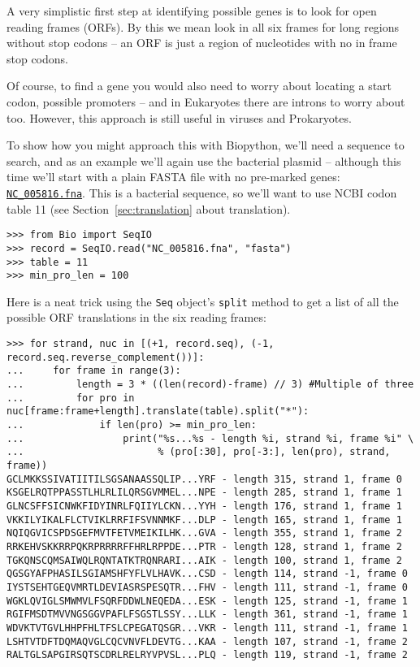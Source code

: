 A very simplistic first step at identifying possible genes is to look for
open reading frames (ORFs).  By this we mean look in all six frames for long
regions without stop codons -- an ORF is just a region of nucleotides with
no in frame stop codons.

Of course, to find a gene you would also need to worry about locating a start
codon, possible promoters -- and in Eukaryotes there are introns to worry about
too.  However, this approach is still useful in viruses and Prokaryotes.

To show how you might approach this with Biopython, we'll need a sequence to
search, and as an example we'll again use the bacterial plasmid -- although
this time we'll start with a plain FASTA file with no pre-marked genes:
\href{https://raw.githubusercontent.com/biopython/biopython/master/Tests/GenBank/NC_005816.fna}
{\texttt{NC\_005816.fna}}. This is a bacterial sequence, so we'll want to use
NCBI codon table 11 (see Section~\ref{sec:translation} about translation).

\begin{verbatim}
>>> from Bio import SeqIO
>>> record = SeqIO.read("NC_005816.fna", "fasta")
>>> table = 11
>>> min_pro_len = 100
\end{verbatim}

Here is a neat trick using the \verb|Seq| object's \verb|split| method to
get a list of all the possible ORF translations in the six reading frames:

\begin{verbatim}
>>> for strand, nuc in [(+1, record.seq), (-1, record.seq.reverse_complement())]:
...     for frame in range(3):
...         length = 3 * ((len(record)-frame) // 3) #Multiple of three
...         for pro in nuc[frame:frame+length].translate(table).split("*"):
...             if len(pro) >= min_pro_len:
...                 print("%s...%s - length %i, strand %i, frame %i" \
...                       % (pro[:30], pro[-3:], len(pro), strand, frame))
GCLMKKSSIVATIITILSGSANAASSQLIP...YRF - length 315, strand 1, frame 0
KSGELRQTPPASSTLHLRLILQRSGVMMEL...NPE - length 285, strand 1, frame 1
GLNCSFFSICNWKFIDYINRLFQIIYLCKN...YYH - length 176, strand 1, frame 1
VKKILYIKALFLCTVIKLRRFIFSVNNMKF...DLP - length 165, strand 1, frame 1
NQIQGVICSPDSGEFMVTFETVMEIKILHK...GVA - length 355, strand 1, frame 2
RRKEHVSKKRRPQKRPRRRRFFHRLRPPDE...PTR - length 128, strand 1, frame 2
TGKQNSCQMSAIWQLRQNTATKTRQNRARI...AIK - length 100, strand 1, frame 2
QGSGYAFPHASILSGIAMSHFYFLVLHAVK...CSD - length 114, strand -1, frame 0
IYSTSEHTGEQVMRTLDEVIASRSPESQTR...FHV - length 111, strand -1, frame 0
WGKLQVIGLSMWMVLFSQRFDDWLNEQEDA...ESK - length 125, strand -1, frame 1
RGIFMSDTMVVNGSGGVPAFLFSGSTLSSY...LLK - length 361, strand -1, frame 1
WDVKTVTGVLHHPFHLTFSLCPEGATQSGR...VKR - length 111, strand -1, frame 1
LSHTVTDFTDQMAQVGLCQCVNVFLDEVTG...KAA - length 107, strand -1, frame 2
RALTGLSAPGIRSQTSCDRLRELRYVPVSL...PLQ - length 119, strand -1, frame 2
\end{verbatim}

